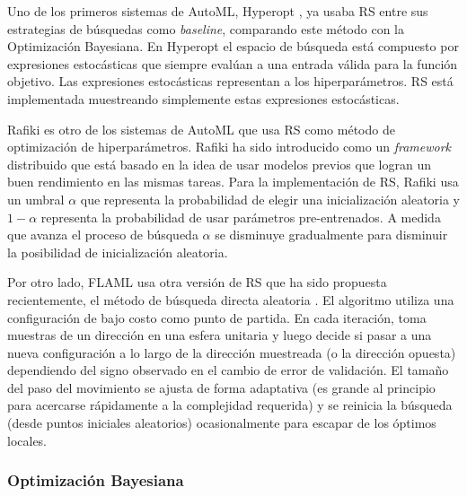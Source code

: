 Uno de los primeros sistemas de AutoML, Hyperopt \cite{bergstra2013hyperopt}, ya usaba RS entre sus estrategias de búsquedas como \textit{baseline}, comparando este método con la Optimización Bayesiana. En Hyperopt el espacio de búsqueda está compuesto por expresiones estocásticas que siempre evalúan a una entrada válida para la función objetivo. Las expresiones estocásticas representan a los hiperparámetros. RS está implementada muestreando simplemente estas expresiones estocásticas.

Rafiki \cite{wang2018rafiki} es otro de los sistemas de AutoML que usa RS como método de optimización de hiperparámetros. Rafiki ha sido introducido como un \textit{framework} distribuido que está basado en la idea de usar modelos previos que logran un buen rendimiento en las mismas tareas. Para la implementación de RS, Rafiki usa un umbral $\alpha$ que representa la probabilidad de elegir una inicialización aleatoria y $1 - \alpha$ representa la probabilidad de usar parámetros pre-entrenados. A medida que avanza el proceso de búsqueda $\alpha$ se disminuye gradualmente para disminuir la posibilidad de inicialización aleatoria.

Por otro lado, FLAML \cite{wang2021flaml} usa otra versión de RS que ha sido propuesta recientemente, el método de búsqueda directa aleatoria \cite{wu2021frugal}. El algoritmo utiliza una configuración de bajo costo como punto de partida. En cada iteración, toma muestras de un dirección en una esfera unitaria y luego decide si pasar a una nueva configuración a lo largo de la dirección muestreada (o la dirección opuesta) dependiendo del signo observado en el cambio de error de validación. El tamaño del paso del movimiento se ajusta de forma adaptativa (es grande al principio para acercarse rápidamente a la complejidad requerida) y se reinicia la búsqueda (desde puntos iniciales aleatorios) ocasionalmente para escapar de los óptimos locales.

\subsubsection{Optimización Bayesiana}



